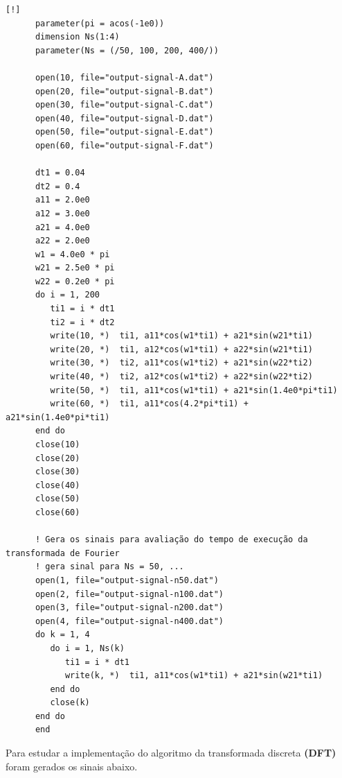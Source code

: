 \documentclass[a4paper, 11pt]{article}
\begin{document}
\begin{verbatim}[!]
      parameter(pi = acos(-1e0))
      dimension Ns(1:4)
      parameter(Ns = (/50, 100, 200, 400/))

      open(10, file="output-signal-A.dat")
      open(20, file="output-signal-B.dat")
      open(30, file="output-signal-C.dat")
      open(40, file="output-signal-D.dat")
      open(50, file="output-signal-E.dat")
      open(60, file="output-signal-F.dat")

      dt1 = 0.04
      dt2 = 0.4
      a11 = 2.0e0
      a12 = 3.0e0
      a21 = 4.0e0
      a22 = 2.0e0
      w1 = 4.0e0 * pi
      w21 = 2.5e0 * pi
      w22 = 0.2e0 * pi
      do i = 1, 200
         ti1 = i * dt1
         ti2 = i * dt2
         write(10, *)  ti1, a11*cos(w1*ti1) + a21*sin(w21*ti1) 
         write(20, *)  ti1, a12*cos(w1*ti1) + a22*sin(w21*ti1) 
         write(30, *)  ti2, a11*cos(w1*ti2) + a21*sin(w22*ti2) 
         write(40, *)  ti2, a12*cos(w1*ti2) + a22*sin(w22*ti2) 
         write(50, *)  ti1, a11*cos(w1*ti1) + a21*sin(1.4e0*pi*ti1) 
         write(60, *)  ti1, a11*cos(4.2*pi*ti1) + a21*sin(1.4e0*pi*ti1) 
      end do
      close(10)
      close(20)
      close(30)
      close(40)
      close(50)
      close(60)

      ! Gera os sinais para avaliação do tempo de execução da transformada de Fourier
      ! gera sinal para Ns = 50, ...
      open(1, file="output-signal-n50.dat")
      open(2, file="output-signal-n100.dat")
      open(3, file="output-signal-n200.dat")
      open(4, file="output-signal-n400.dat")
      do k = 1, 4
         do i = 1, Ns(k)
            ti1 = i * dt1
            write(k, *)  ti1, a11*cos(w1*ti1) + a21*sin(w21*ti1) 
         end do
         close(k)
      end do
      end
\end{verbatim}

Para estudar a implementação do algoritmo da transformada discreta {\bfseries (DFT) } foram gerados
os sinais abaixo.
\end{document}
